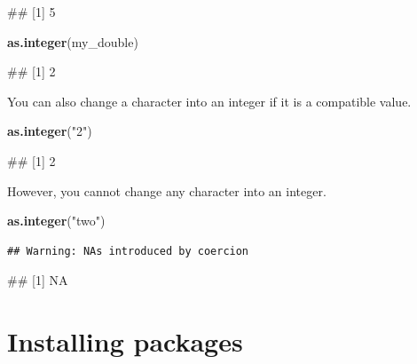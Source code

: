 \documentclass[
]{book}
\newenvironment{Shaded}{\begin{snugshade}}{\end{snugshade}}
\newcommand{\FunctionTok}[1]{\textcolor[rgb]{0.13,0.29,0.53}{\textbf{#1}}}
\newcommand{\NormalTok}[1]{#1}
\newcommand{\StringTok}[1]{\textcolor[rgb]{0.31,0.60,0.02}{#1}}
\begin{document}
\begin{Shaded}
\begin{Highlighting}[]
\NormalTok{\#\# [1] 5}
\end{Highlighting}
\end{Shaded}

\begin{Shaded}
\begin{Highlighting}[]
\FunctionTok{as.integer}\NormalTok{(my\_double)}
\end{Highlighting}
\end{Shaded}

\begin{Shaded}
\begin{Highlighting}[]
\NormalTok{\#\# [1] 2}
\end{Highlighting}
\end{Shaded}

You can also change a character into an integer if it is a compatible value.

\begin{Shaded}
\begin{Highlighting}[]
\FunctionTok{as.integer}\NormalTok{(}\StringTok{"2"}\NormalTok{)}
\end{Highlighting}
\end{Shaded}

\begin{Shaded}
\begin{Highlighting}[]
\NormalTok{\#\# [1] 2}
\end{Highlighting}
\end{Shaded}

However, you cannot change any character into an integer.

\begin{Shaded}
\begin{Highlighting}[]
\FunctionTok{as.integer}\NormalTok{(}\StringTok{"two"}\NormalTok{)}
\end{Highlighting}
\end{Shaded}

\begin{verbatim}
## Warning: NAs introduced by coercion
\end{verbatim}

\begin{Shaded}
\begin{Highlighting}[]
\NormalTok{\#\# [1] NA}
\end{Highlighting}
\end{Shaded}

\hypertarget{installing-packages}{%
\section{Installing packages}\label{installing-packages}}
\end{document}

